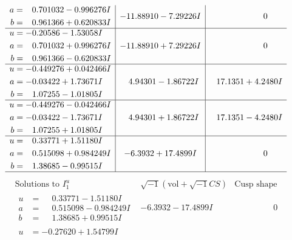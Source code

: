 \documentclass[1p]{elsarticle_modified}
\theoremstyle{definition}
\newcommand{\I}{\sqrt{-1}}
\begin{document}
$$\begin{array}{c|c|c}
\begin{aligned}
a &= \phantom{-}0.701032 - 0.996276 I \\
b &= \phantom{-}0.961366 + 0.620833 I\end{aligned}
 & -11.88910 - 7.29226 I & \phantom{-0.000000 } 0 \\ \hline\begin{aligned}
u &= -0.20586 - 1.53058 I \\
a &= \phantom{-}0.701032 + 0.996276 I \\
b &= \phantom{-}0.961366 - 0.620833 I\end{aligned}
 & -11.88910 + 7.29226 I & \phantom{-0.000000 } 0 \\ \hline\begin{aligned}
u &= -0.449276 + 0.042466 I \\
a &= -0.03422 + 1.73671 I \\
b &= \phantom{-}1.07255 - 1.01805 I\end{aligned}
 & \phantom{-}4.94301 - 1.86722 I & \phantom{-}17.1351 + 4.2480 I \\ \hline\begin{aligned}
u &= -0.449276 - 0.042466 I \\
a &= -0.03422 - 1.73671 I \\
b &= \phantom{-}1.07255 + 1.01805 I\end{aligned}
 & \phantom{-}4.94301 + 1.86722 I & \phantom{-}17.1351 - 4.2480 I \\ \hline\begin{aligned}
u &= \phantom{-}0.33771 + 1.51180 I \\
a &= \phantom{-}0.515098 + 0.984249 I \\
b &= \phantom{-}1.38685 - 0.99515 I\end{aligned}
 & -6.3932 + 17.4899 I & \phantom{-0.000000 } 0\\
 \hline 
 \end{array}$$\newpage$$\begin{array}{c|c|c}  
\text{Solutions to }I^u_{1}& \I (\text{vol} + \sqrt{-1}CS) & \text{Cusp shape}\\
 \hline 
\begin{aligned}
u &= \phantom{-}0.33771 - 1.51180 I \\
a &= \phantom{-}0.515098 - 0.984249 I \\
b &= \phantom{-}1.38685 + 0.99515 I\end{aligned}
 & -6.3932 - 17.4899 I & \phantom{-0.000000 } 0 \\ \hline\begin{aligned}
u &= -0.27620 + 1.54799 I \\

\end{aligned}
\end{array}$$
\end{document}
